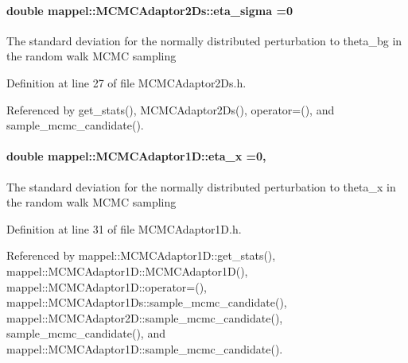 \paragraph[{\texorpdfstring{eta\+\_\+sigma}{eta_sigma}}]{\setlength{\rightskip}{0pt plus 5cm}double mappel\+::\+M\+C\+M\+C\+Adaptor2\+Ds\+::eta\+\_\+sigma =0\hspace{0.3cm}{\ttfamily [protected]}}\hypertarget{classmappel_1_1MCMCAdaptor2Ds_ae5305087fd5abee9b38324be42d57a70}{}\label{classmappel_1_1MCMCAdaptor2Ds_ae5305087fd5abee9b38324be42d57a70}
The standard deviation for the normally distributed perturbation to theta\+\_\+bg in the random walk M\+C\+MC sampling 

Definition at line 27 of file M\+C\+M\+C\+Adaptor2\+Ds.\+h.



Referenced by get\+\_\+stats(), M\+C\+M\+C\+Adaptor2\+Ds(), operator=(), and sample\+\_\+mcmc\+\_\+candidate().

\paragraph[{\texorpdfstring{eta\+\_\+x}{eta_x}}]{\setlength{\rightskip}{0pt plus 5cm}double mappel\+::\+M\+C\+M\+C\+Adaptor1\+D\+::eta\+\_\+x =0\hspace{0.3cm}{\ttfamily [protected]}, {\ttfamily [inherited]}}\hypertarget{classmappel_1_1MCMCAdaptor1D_ae5787e38c9cef6168acf6fc5d3216693}{}\label{classmappel_1_1MCMCAdaptor1D_ae5787e38c9cef6168acf6fc5d3216693}
The standard deviation for the normally distributed perturbation to theta\+\_\+x in the random walk M\+C\+MC sampling 

Definition at line 31 of file M\+C\+M\+C\+Adaptor1\+D.\+h.



Referenced by mappel\+::\+M\+C\+M\+C\+Adaptor1\+D\+::get\+\_\+stats(), mappel\+::\+M\+C\+M\+C\+Adaptor1\+D\+::\+M\+C\+M\+C\+Adaptor1\+D(), mappel\+::\+M\+C\+M\+C\+Adaptor1\+D\+::operator=(), mappel\+::\+M\+C\+M\+C\+Adaptor1\+Ds\+::sample\+\_\+mcmc\+\_\+candidate(), mappel\+::\+M\+C\+M\+C\+Adaptor2\+D\+::sample\+\_\+mcmc\+\_\+candidate(), sample\+\_\+mcmc\+\_\+candidate(), and mappel\+::\+M\+C\+M\+C\+Adaptor1\+D\+::sample\+\_\+mcmc\+\_\+candidate().

